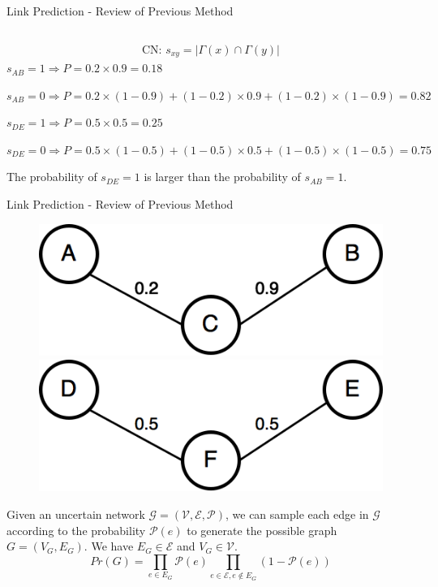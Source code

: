 \documentclass[9pt]{beamer}
\begin{document}
\begin{frame}{Link Prediction - Review of Previous Method}
\begin{columns}[T,onlytextwidth]
  \end{columns}
  
\begin{align*}
\text{CN: }s_{xy}=|\Gamma(x)\cap\Gamma(y)|
\end{align*}
\small
$s_{AB}=1 \Rightarrow P=0.2\times 0.9=0.18$ 

$s_{AB}=0 \Rightarrow P=0.2\times(1-0.9)+(1-0.2)\times0.9+(1-0.2)\times(1-0.9)=0.82$

$s_{DE}=1 \Rightarrow P=0.5\times 0.5=0.25$ 

$s_{DE}=0 \Rightarrow P=0.5\times(1-0.5)+(1-0.5)\times0.5+(1-0.5)\times(1-0.5)=0.75$

The probability of $s_{DE}=1$ is larger than the probability of $s_{AB}=1$. 

\end{frame}



\begin{frame}{Link Prediction - Review of Previous Method}
\begin{figure}
\includegraphics[scale = 0.23]{common_neighbor_2.png}
\hspace{1cm}
\includegraphics[scale = 0.23]{common_neighbor_1.png}
\centering
\end{figure}
Given an uncertain network $\mathcal{G = (V,E,P)}$, we can sample each edge in $\mathcal{G}$ according to the probability $\mathcal{P}(e)$ to generate the possible graph $G = (V_G,E_G)$. We have $E_G \in \mathcal{E}$ and $V_G \in \mathcal{V}$.
\begin{equation}
Pr(G) = \prod_{e\in E_G}\mathcal{P}(e)\prod_{e\in \mathcal{E}, e\notin E_G}(1-\mathcal{P}(e))
\end{equation}
\end{frame}
\end{document}
